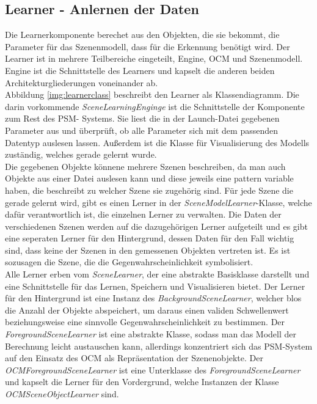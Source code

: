 \subsection{Learner - Anlernen der Daten}
Die Learnerkomponente berechet aus den Objekten, die sie bekommt, die Parameter für das Szenenmodell, dass für die Erkennung benötigt wird. Der Learner ist in mehrere Teilbereiche eingeteilt, Engine, OCM und Szenenmodell. Engine ist die Schnittstelle des Learners und kapselt die anderen beiden Architekturgliederungen voneinander ab.\smallskip\\
Abbildung \ref{img:learnerclass} beschreibt den Learner als Klassendiagramm. Die darin vorkommende \textit{SceneLearningEnginge} ist die Schnittstelle der Komponente zum Rest des PSM- Systems. Sie liest die in der Launch-Datei gegebenen Parameter aus und überprüft, ob alle Parameter sich mit dem passenden Datentyp auslesen lassen. Außerdem ist die Klasse für Visualisierung des Modells zuständig, welches gerade gelernt wurde. \smallskip\\
Die gegebenen Objekte könnene mehrere Szenen beschreiben, da man auch Objekte aus einer Datei auslesen kann und diese jeweils eine pattern variable haben, die beschreibt zu welcher Szene sie zugehörig sind. Für jede Szene die gerade gelernt wird, gibt es einen Lerner in der \textit{SceneModelLearner}-Klasse, welche dafür verantwortlich ist, die einzelnen Lerner zu verwalten. Die Daten der verschiedenen Szenen werden auf die dazugehörigen Lerner aufgeteilt und es gibt eine seperaten Lerner für den Hintergrund, dessen Daten für den Fall wichtig sind, dass keine der Szenen in den gemessenen Objekten vertreten ist. Es ist sozusagen die Szene, die die Gegenwahrscheinlichkeit symbolisiert.\smallskip\\
Alle Lerner erben vom \textit{SceneLearner}, der eine abstrakte Basisklasse darstellt und eine Schnittstelle für das Lernen, Speichern und Visualisieren bietet. Der Lerner für den Hintergrund ist eine Instanz des \textit{BackgroundSceneLearner}, welcher blos die Anzahl der Objekte abspeichert, um daraus einen validen Schwellenwert beziehungsweise eine sinnvolle Gegenwahrscheinlichkeit zu bestimmen. Der \textit{ForegroundSceneLearner} ist eine abstrakte Klasse, sodass man das Modell der Berechnung leicht austauschen kann, allerdings konzentriert sich das PSM-System auf den Einsatz des OCM als Repräsentation der Szenenobjekte. Der \textit{OCMForegroundSceneLearner} ist eine Unterklasse des \textit{ForegroundSceneLearner} und kapselt die Lerner für den Vordergrund, welche Instanzen der Klasse \textit{OCMSceneObjectLearner} sind.

